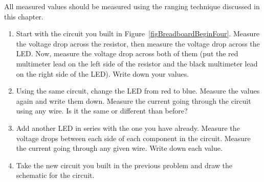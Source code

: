 \applysection

All measured values should be measured using the ranging technique discussed in this chapter.

\begin{enumerate}
\item Start with the circuit you built in Figure~\ref{figBreadboardBeginFour}.  Measure the voltage drop across the resistor, then measure the voltage drop across the LED.  Now, measure the voltage drop across both of them (put the red multimeter lead on the left side of the resistor and the black multimeter lead on the right side of the LED).  Write down your values.
\item Using the same circuit, change the LED from red to blue.   Measure the values again and write them down.  Measure the current going through the circuit using any wire.  Is it the same or different than before?
\item Add another LED in series with the one you have already.  Measure the voltage drops between each side of each component in the circuit.  Measure the current going through any given wire.  Write down each value.
\item Take the new circuit you built in the previous problem and draw the schematic for the circuit.
\end{enumerate}
